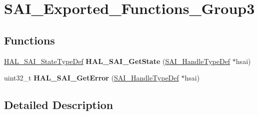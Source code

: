 \hypertarget{group___s_a_i___exported___functions___group3}{}\section{S\+A\+I\+\_\+\+Exported\+\_\+\+Functions\+\_\+\+Group3}
\label{group___s_a_i___exported___functions___group3}
\subsection*{Functions}
\begin{DoxyCompactItemize}
\item 
\hyperlink{group___s_a_i___exported___types_gac758df9679f0ee29c77d9b1b66289589}{H\+A\+L\+\_\+\+S\+A\+I\+\_\+\+State\+Type\+Def} {\bfseries H\+A\+L\+\_\+\+S\+A\+I\+\_\+\+Get\+State} (\hyperlink{group___s_a_i___exported___types_gaf45214e5c90f73800130b3945bf45144}{S\+A\+I\+\_\+\+Handle\+Type\+Def} $\ast$hsai)\hypertarget{group___s_a_i___exported___functions___group3_gabb8d63dd7f76724e9ac3d4bce2892ec8}{}\label{group___s_a_i___exported___functions___group3_gabb8d63dd7f76724e9ac3d4bce2892ec8}

\item 
uint32\+\_\+t {\bfseries H\+A\+L\+\_\+\+S\+A\+I\+\_\+\+Get\+Error} (\hyperlink{group___s_a_i___exported___types_gaf45214e5c90f73800130b3945bf45144}{S\+A\+I\+\_\+\+Handle\+Type\+Def} $\ast$hsai)\hypertarget{group___s_a_i___exported___functions___group3_ga9d8f241af467a09b55d77cf33d58c600}{}\label{group___s_a_i___exported___functions___group3_ga9d8f241af467a09b55d77cf33d58c600}

\end{DoxyCompactItemize}


\subsection{Detailed Description}
